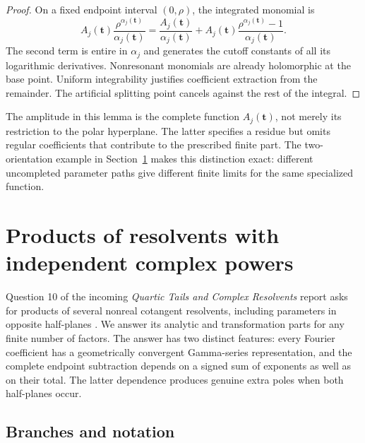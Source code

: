 \documentclass[11pt]{article}
\numberwithin{equation}{section}
\theoremstyle{plain}
\theoremstyle{definition}
\theoremstyle{remark}
\begin{document}
\begin{proof}
On a fixed endpoint interval $(0,\rho)$, the integrated monomial is
\[
 A_j(\mathbf t)\frac{\rho^{\alpha_j(\mathbf t)}}
                            {\alpha_j(\mathbf t)}
 =\frac{A_j(\mathbf t)}{\alpha_j(\mathbf t)}
  +A_j(\mathbf t)
       \frac{\rho^{\alpha_j(\mathbf t)}-1}{\alpha_j(\mathbf t)}.
\]
The second term is entire in $\alpha_j$ and generates the cutoff
constants of all its logarithmic derivatives. Nonresonant monomials are
already holomorphic at the base point. Uniform integrability justifies
coefficient extraction from the remainder. The artificial splitting
point cancels against the rest of the integral.
\end{proof}

The amplitude in this lemma is the complete function
$A_j(\mathbf t)$, not merely its restriction to the polar hyperplane.
The latter specifies a residue but omits regular coefficients that
contribute to the prescribed finite part. The two-orientation example
in Section~\ref{mr:section} makes this distinction exact: different
uncompleted parameter paths give different finite limits for the same
specialized function.



\section{Products of resolvents with independent complex powers}
\label{mr:section}

Question 10 of the incoming \emph{Quartic Tails and Complex Resolvents}
report asks for products of several nonreal cotangent resolvents, including
parameters in opposite half-planes \cite{repo:quartic}. We answer its
analytic and transformation parts for any finite number of factors.
The answer has two distinct features: every Fourier coefficient has a
geometrically convergent Gamma-series representation, and the complete
endpoint subtraction depends on a signed sum of exponents as well as on
their total. The latter dependence produces genuine extra poles when both
half-planes occur.

\subsection{Branches and notation}
\end{document}
